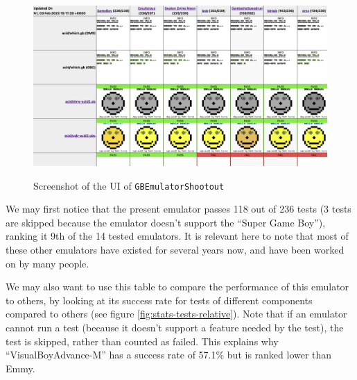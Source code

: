 \documentclass[11pt]{report}
\begin{document}
\begin{figure}[h]
    \centering
    \includegraphics[width=15cm]{images/gb-shootout}\\
    \caption{Screenshot of the UI of \texttt{GBEmulatorShootout}}
    \label{fig:gb-shootout}
\end{figure}

We may first notice that the present emulator passes 118 out of 236 tests (3 tests are skipped because the emulator doesn't support the ``Super Game Boy''), ranking it 9th of the 14 tested emulators. It is relevant here to note that most of these other emulators have existed for several years now, and have been worked on by many people.

We may also want to use this table to compare the performance of this emulator to others, by looking at its success rate for tests of different components compared to others (see figure \ref{fig:stats-tests-relative}). Note that if an emulator cannot run a test (because it doesn't support a feature needed by the test), the test is skipped, rather than counted as failed. This explains why ``VisualBoyAdvance-M'' has a success rate of 57.1\% but is ranked lower than Emmy.
\end{document}
